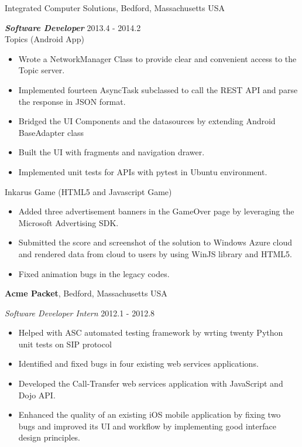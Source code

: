 \documentclass[margin,line]{res}
\begin{document}
\begin{resume}
{Integrated Computer Solutions}, Bedford, Massachusetts USA

\vspace{-.3cm}
{\em {\bf Software Developer}} \hfill {2013.4 - 2014.2}\\
Topics (Android App)
\begin{itemize}
\item Wrote a NetworkManager Class to provide clear and convenient access to the Topic server.
\item Implemented fourteen AsyncTask subclassed to call the REST API and parse the response
in JSON format.
\item Bridged the UI Components and the datasources by extending Android BaseAdapter class
\item Built the UI with fragments and navigation drawer.
\item Implemented unit tests for APIs with pytest in Ubuntu environment.
\end{itemize}

Inkarus Game (HTML5 and Javascript Game)
\begin{itemize}
\item Added three advertisement banners in the GameOver page by leveraging 
the Microsoft Advertising SDK.
\item Submitted the score and screenshot of the solution to Windows Azure cloud
and rendered data from cloud to users by using WinJS library and HTML5.
\item Fixed animation bugs in the legacy codes.
\end{itemize}

{\bf Acme Packet}, Bedford, Massachusetts USA

\vspace{-.3cm}
{\em Software Developer Intern} \hfill {2012.1 - 2012.8}\\
\begin{itemize}
\item Helped with ASC automated testing framework by wrting twenty Python unit tests on SIP protocol
\item Identified and fixed bugs in four existing web services applications.
\item Developed the Call-Transfer web services application with JavaScript and Dojo API.
\item Enhanced the quality of an existing iOS mobile application by fixing two bugs and improved its UI and workflow by implementing good interface design principles.
\end{itemize}


\end{resume}
\end{document}
